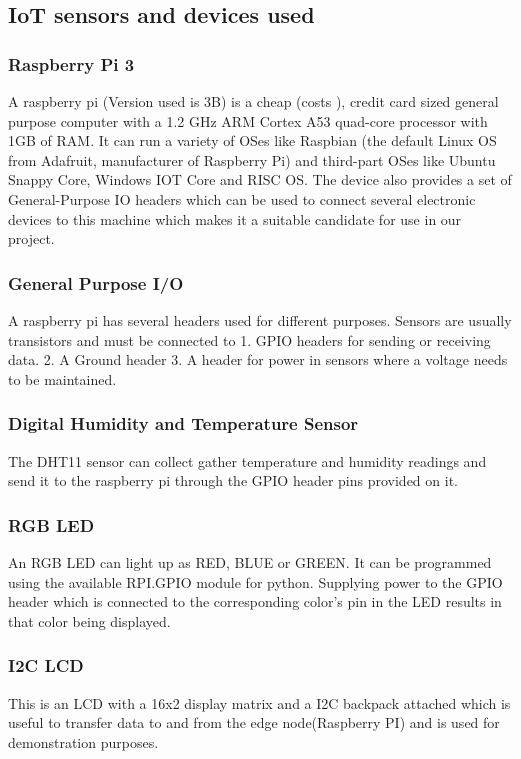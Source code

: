 \documentclass[11pt,openright]{report}
\begin{document}
\subsection{IoT sensors and devices used}
\subsubsection{Raspberry Pi 3}
A raspberry pi (Version used is 3B) is a cheap (costs ), credit card sized general purpose computer with a 1.2 GHz ARM Cortex A53 quad-core processor with 1GB of RAM. It can run a variety of OSes like Raspbian (the default Linux OS from Adafruit, manufacturer of Raspberry Pi) and third-part OSes like Ubuntu Snappy Core, Windows IOT Core and RISC OS. The device also provides a set of General-Purpose IO headers which can be used to connect several electronic devices to this machine which makes it a suitable candidate for use in our project.

\subsubsection{General Purpose I/O}
A raspberry pi has several headers used for different purposes. Sensors are usually transistors and must be connected to 
1. GPIO headers for sending or receiving data.
2. A Ground header
3. A header for power in sensors where a voltage needs to be maintained.

\subsubsection{Digital Humidity and Temperature Sensor}
The DHT11 sensor can collect gather temperature and humidity readings and send it to the raspberry pi through the GPIO header pins provided on it.

\subsubsection{RGB LED}
An RGB LED can light up as RED, BLUE or GREEN. It can be programmed using the available RPI.GPIO module for python. Supplying power to the GPIO header which is connected to the corresponding color’s pin in the LED results in that color being displayed. 

\subsubsection{I2C LCD}
This is an LCD with a 16x2 display matrix and a I2C backpack attached which is useful to transfer data to and from the edge node(Raspberry PI) and is used for demonstration purposes.
\end{document}
